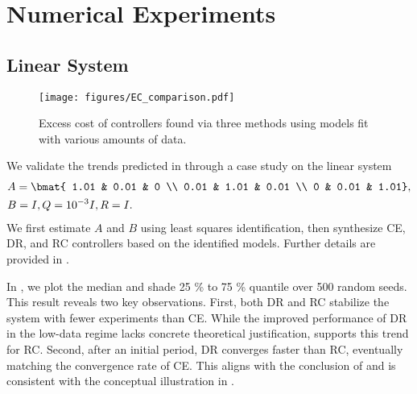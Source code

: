 \section{Numerical Experiments}
\label{s: numerical}



\subsection{Linear System}

\begin{wrapfigure}[9]{r}{0.5\textwidth}
    \centering
    \vspace{-25pt} %
    \texttt{[image: figures/EC\_comparison.pdf]}
    \vspace{-21pt} %
    \caption{Excess cost of controllers found via three methods using models fit with various amounts of data.}
    \label{fig:result dr lqr}
\end{wrapfigure}
\renewcommand{\arraystretch}{1.0}
We validate the trends predicted in  through a case study on the linear system 
\vspace{-3pt}
\begin{align}
    &A = \bmat{
        1.01 & 0.01 & 0 \\
        0.01 & 1.01 & 0.01 \\
        0 & 0.01 & 1.01}, \nonumber\\
    &B = I, Q = 10^{-3}I, R = I. \label{eq:numerical experiments params}
\end{align}
We first estimate $A$ and $B$ using least squares identification, then synthesize CE, DR, and RC controllers based on the identified models. Further details are provided in .


In , we plot the median and shade 25 \% to 75 \% quantile over 500 random seeds. 
This result reveals two key observations. First, both DR and RC stabilize the system with fewer experiments than CE. While the improved performance of DR in the low-data regime lacks concrete theoretical justification,  supports this trend for RC. Second, after an initial period, DR converges faster than RC, eventually matching the convergence rate of CE. This aligns with the conclusion of  and is consistent with the conceptual illustration in .


